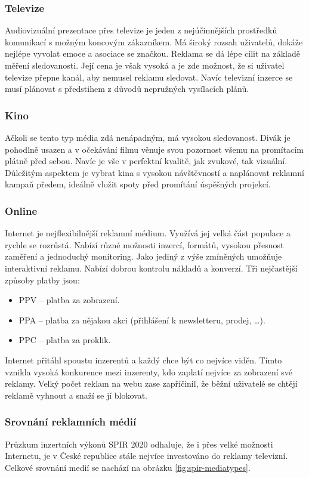     \subsubsection{Televize}
    Audiovizuální prezentace přes televize je jeden z nejúčinnějších prostředků komunikací s možným koncovým zákazníkem.
    Má široký rozsah uživatelů, dokáže nejlépe vyvolat emoce a asociace se značkou. Reklama se dá lépe cílit na základě měření sledovanosti.
    Její cena je však vysoká a je zde možnost, že si uživatel televize přepne kanál, aby nemusel reklamu sledovat.
    Navíc televizní inzerce se musí plánovat s předstihem z důvodů nepružných vysílacích plánů.
    
    \subsubsection{Kino}
    Ačkoli se tento typ média zdá nenápadným, má vysokou sledovanost. Divák je pohodlně usazen a v očekávání filmu věnuje svou pozornost všemu na promítacím plátně před sebou.
    Navíc je vše v perfektní kvalitě, jak zvukové, tak vizuální. Důležitým aspektem je vybrat kina s vysokou návštěvností a naplánovat reklamní kampaň předem, ideálně vložit spoty před promítání úspěšných projekcí.

    \subsubsection{Online}
    Internet je nejflexibilnější reklamní médium. Využívá jej velká část populace a rychle se rozrůstá. Nabízí různé možnosti inzercí, formátů,
    vysokou přesnost zaměření a jednoduchý monitoring. Jako jediný z výše zmíněných umožňuje interaktivní reklamu. Nabízí dobrou kontrolu nákladů a konverzí.
    Tři nejčastější způsoby platby jsou:
    \begin{itemize}
        \item PPV -- platba za zobrazení.
        \item PPA -- platba za nějakou akci (přihlášení k newsletteru, prodej, \ldots).
        \item PPC -- platba za proklik.
    \end{itemize}
    Internet přitáhl spoustu inzerentů a každý chce být co nejvíce viděn. Tímto vznikla vysoká konkurence mezi inzerenty, kdo zaplatí nejvíce za zobrazení své reklamy.
    Velký počet reklam na webu zase zapříčinil, že běžní uživatelé se chtějí reklamě vyhnout a snaží se jí blokovat.
    
    \subsubsection{Srovnání reklamních médií}
    Průzkum inzertních výkonů SPIR 2020 odhaluje, že i přes velké možnosti Internetu, je v České republice stále nejvíce investováno do reklamy televizní.
    Celkové srovnání medií se nachází na obrázku \ref{fig:spir-mediatypes}.


